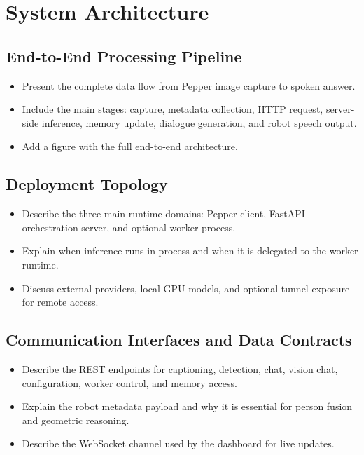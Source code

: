 \documentclass[
  digital,     %
  oneside,     %
  nosansbold,  %
  nocolorbold, %
  lof,         %
  lot,         %
]{fithesis4}
\begin{document}
\chapter{System Architecture}

\section{End-to-End Processing Pipeline}
\begin{itemize}
    \item Present the complete data flow from Pepper image capture to spoken answer.
    \item Include the main stages: capture, metadata collection, HTTP request, server-side inference, memory update, dialogue generation, and robot speech output.
    \item Add a figure with the full end-to-end architecture.
\end{itemize}

\section{Deployment Topology}
\begin{itemize}
    \item Describe the three main runtime domains: Pepper client, FastAPI orchestration server, and optional worker process.
    \item Explain when inference runs in-process and when it is delegated to the worker runtime.
    \item Discuss external providers, local GPU models, and optional tunnel exposure for remote access.
\end{itemize}

\section{Communication Interfaces and Data Contracts}
\begin{itemize}
    \item Describe the REST endpoints for captioning, detection, chat, vision chat, configuration, worker control, and memory access.
    \item Explain the robot metadata payload and why it is essential for person fusion and geometric reasoning.
    \item Describe the WebSocket channel used by the dashboard for live updates.
\end{itemize}
\end{document}
